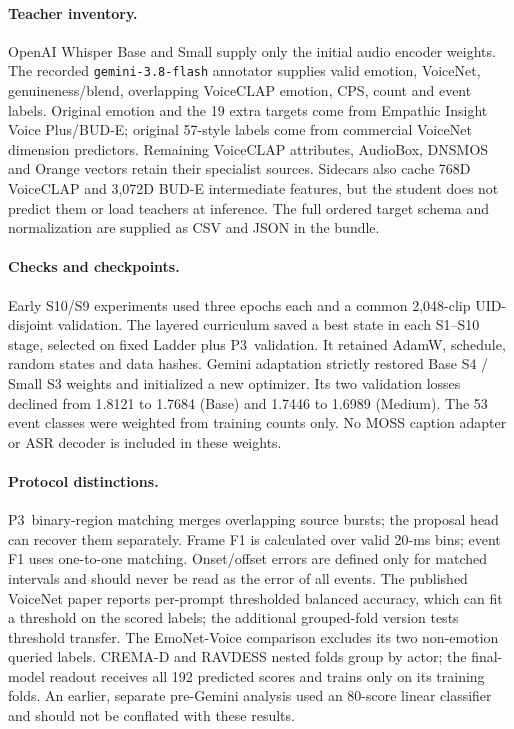 \documentclass{article}
\newcommand{\pthree}{\textsc{P3}}
\begin{document}
\paragraph{Teacher inventory.} OpenAI Whisper Base and Small supply only the initial audio encoder weights. The recorded \texttt{gemini-3.8-flash} annotator supplies valid emotion, VoiceNet, genuineness/blend, overlapping VoiceCLAP emotion, CPS, count and event labels. Original emotion and the 19 extra targets come from Empathic Insight Voice Plus/BUD-E; original 57-style labels come from commercial VoiceNet dimension predictors. Remaining VoiceCLAP attributes, AudioBox, DNSMOS and Orange vectors retain their specialist sources. Sidecars also cache 768D VoiceCLAP and 3,072D BUD-E intermediate features, but the student does not predict them or load teachers at inference. The full ordered target schema and normalization are supplied as CSV and JSON in the bundle.

\paragraph{Checks and checkpoints.} Early S10/S9 experiments used three epochs each and a common 2,048-clip UID-disjoint validation. The layered curriculum saved a best state in each S1--S10 stage, selected on fixed Ladder plus \pthree\ validation. It retained AdamW, schedule, random states and data hashes. Gemini adaptation strictly restored Base S4 / Small S3 weights and initialized a new optimizer. Its two validation losses declined from 1.8121 to 1.7684 (Base) and 1.7446 to 1.6989 (Medium). The 53 event classes were weighted from training counts only. No MOSS caption adapter or ASR decoder is included in these weights.

\paragraph{Protocol distinctions.} \pthree\ binary-region matching merges overlapping source bursts; the proposal head can recover them separately. Frame F1 is calculated over valid 20-ms bins; event F1 uses one-to-one matching. Onset/offset errors are defined only for matched intervals and should never be read as the error of all events. The published VoiceNet paper reports per-prompt thresholded balanced accuracy, which can fit a threshold on the scored labels; the additional grouped-fold version tests threshold transfer. The EmoNet-Voice comparison excludes its two non-emotion queried labels. CREMA-D and RAVDESS nested folds group by actor; the final-model readout receives all 192 predicted scores and trains only on its training folds. An earlier, separate pre-Gemini analysis used an 80-score linear classifier and should not be conflated with these results.
\end{document}
